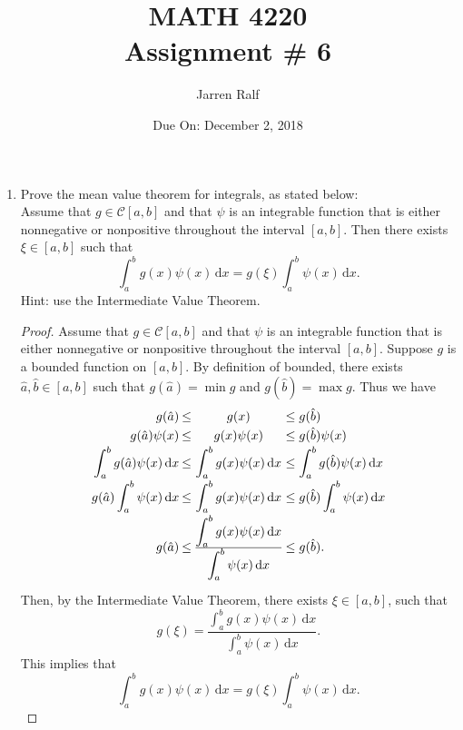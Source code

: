 \documentclass{article}
\title{MATH 4220 \\ Assignment \# 6}
\author{Jarren Ralf}
\date{Due On: December 2, 2018}
\begin{document}
	\maketitle
	
	\begin{enumerate}[label = {\arabic*}]
		\item Prove the mean value theorem for integrals, as stated below: \\
		
		Assume that $g \in \mathcal{C}[a, b]$ and that $\psi$ is an integrable function that is either nonnegative or nonpositive throughout the interval $[a, b]$. Then there exists $\xi \in [a, b]$ such that \[ \int_{a}^{b} g(x) \psi(x) \, \mathrm{d}x = g(\xi) \int_{a}^{b} \psi(x) \, \mathrm{d}x. \] Hint: use the Intermediate Value Theorem.
		
		\begin{proof}
			Assume that $g \in \mathcal{C}[a, b]$ and that $\psi$ is an integrable function that is either nonnegative or nonpositive throughout the interval $[a, b]$. Suppose $g$ is a bounded function on $[a, b]$. By definition of bounded, there exists $\hat{a}, \hat{b} \in [a, b]$ such that $g(\hat{a}) = \min g$ and $g(\hat{b}) = \max g$. Thus we have
			\[\setlength\arraycolsep{1pt}
				\begin{array}{rccl}
					\vspace{2pt}
					g(\hat{a}) &\leq& g(x) &\leq g(\hat{b}) \\
					\vspace{2pt}
					g(\hat{a})\psi(x) &\leq& g(x)\psi(x) &\leq g(\hat{b})\psi(x) \\
					\vspace{2pt}
					\displaystyle\int_{a}^{b} g(\hat{a}) \psi(x) \,\mathrm{d}x &\leq& \displaystyle\int_{a}^{b} g(x) \psi(x) \,\mathrm{d}x &\leq \displaystyle\int_{a}^{b} g(\hat{b})\psi(x) \,\mathrm{d}x\\
					\vspace{2pt}
					g(\hat{a}) \displaystyle\int_{a}^{b} \psi(x) \,\mathrm{d}x &\leq& \displaystyle\int_{a}^{b} g(x) \psi(x) \,\mathrm{d}x &\leq g(\hat{b}) \displaystyle\int_{a}^{b} \psi(x) \,\mathrm{d}x\\
					\vspace{2pt}
					g(\hat{a}) &\leq& \frac{\displaystyle\int_{a}^{b} g(x) \psi(x) \, \mathrm{d}x}{\displaystyle\int_{a}^{b}\psi(x) \,\mathrm{d}x} &\leq g(\hat{b}).\\
				\end{array}
			\]
			Then, by the Intermediate Value Theorem, there exists $\xi \in [a, b]$, such that \[ g(\xi) = \frac{\displaystyle\int_{a}^{b} g(x) \psi(x) \, \mathrm{d}x}{\displaystyle\int_{a}^{b}\psi(x) \,\mathrm{d}x}. \] This implies that \[ \int_{a}^{b} g(x) \psi(x) \, \mathrm{d}x = g(\xi) \int_{a}^{b} \psi(x) \, \mathrm{d}x. \]
		\end{proof}
	

\end{enumerate}
\end{document}
